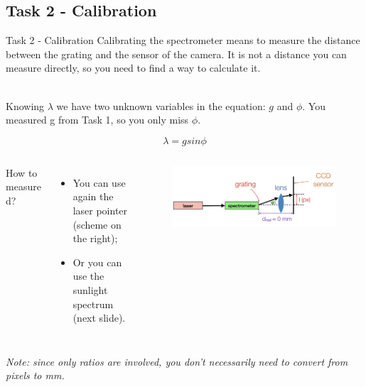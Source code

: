 \documentclass[9pt, xcolor=dvipsnames]{beamer}
\begin{document}
\subsection{ Task 2 - Calibration}

\begin{frame}{Task 2 - Calibration}	
Calibrating the spectrometer means to measure the distance between the grating and the sensor of the camera. It is not a distance you can measure directly, so you need to find a way to calculate it.

~\\
	Knowing $\lambda$ we have two unknown variables in the equation: $g$ and $\phi$. You measured g from Task 1, so you only miss $\phi$.

\begin{equation*}
		 \lambda = g sin \phi
	\end{equation*}
	
	\begin{columns}
	How to measure d? 
	\begin{itemize}
		\item You can use again the laser pointer (scheme on the right);
		\item Or you can use the sunlight spectrum (next slide).
	\end{itemize}

	
		
		\begin{figure}
		\begin{centering}
			\centering
			\includegraphics[width=1 \textwidth]{Figures/calibration.png}
		\end{centering}
		\end{figure}
\end{columns}
	
\textit{Note: since only ratios are involved, you don't necessarily need to convert from pixels to mm.}
	
		
\end{frame}
\end{document}
